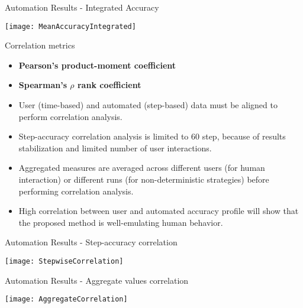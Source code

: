 \begin{frame}[t,fragile]{Automation Results - Integrated Accuracy}
\begin{center}
\texttt{[image: MeanAccuracyIntegrated]}
\end{center}
\end{frame}

\begin{frame}[t,fragile]{Correlation metrics}
\begin{itemize}
  \item \textbf{Pearson's product-moment coefficient} 
  \item \textbf{Spearman's $\rho$ rank coefficient}
\end{itemize}
\begin{itemize}
  \item User (time-based) and automated (step-based) data must be aligned to perform correlation analysis.
  \item Step-accuracy correlation analysis is limited to 60 step, because of results stabilization and limited number of user interactions.
  \item Aggregated measures are averaged across different users (for human interaction) or different runs (for non-deterministic strategies) before performing correlation analysis.
  \item High correlation between user and automated accuracy profile will show that the proposed method is well-emulating human behavior. 
\end{itemize}
\end{frame}

\begin{frame}[t,fragile]{Automation Results - Step-accuracy correlation}
\begin{center}
\texttt{[image: StepwiseCorrelation]}
\end{center}
\end{frame}

\begin{frame}[t,fragile]{Automation Results - Aggregate values correlation}
\begin{center}
\texttt{[image: AggregateCorrelation]}
\end{center}
\end{frame}

